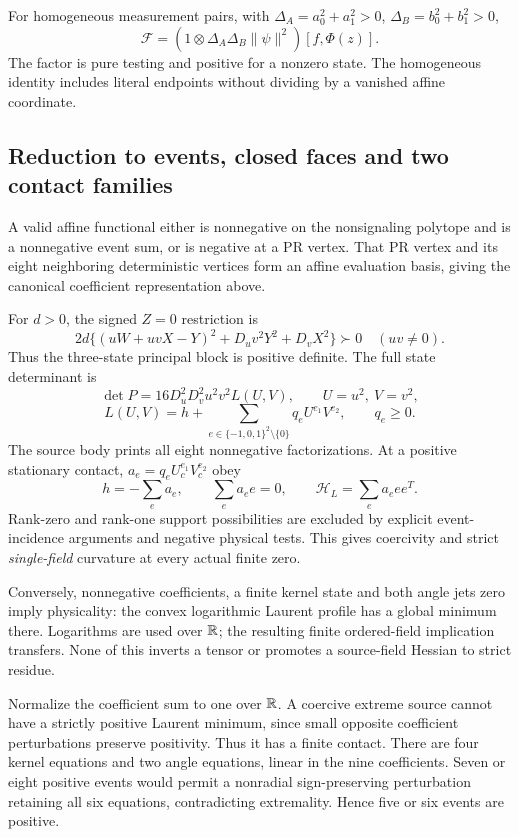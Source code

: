 For homogeneous measurement pairs, with
\(\Delta_A=a_0^2+a_1^2>0\), \(\Delta_B=b_0^2+b_1^2>0\),
\[
 \mathcal F=(1\otimes\Delta_A\Delta_B\|\psi\|^2)[f,\Phi(z)].
\]
The factor is pure testing and positive for a nonzero state.
The homogeneous identity includes literal endpoints without dividing
by a vanished affine coordinate. 

\subsection{Reduction to events, closed faces and two contact families}

A valid affine functional either is nonnegative on the nonsignaling
polytope and is a nonnegative event sum, or is negative at a PR vertex.
That PR vertex and its eight neighboring deterministic vertices form
an affine evaluation basis, giving the canonical coefficient
representation above.

For \(d>0\), the signed \(Z=0\) restriction is
\[
 2d\{(uW+uvX-Y)^2+D_uv^2Y^2+D_vX^2\}\succ0
 \quad(uv\ne0).
\]
Thus the three-state principal block is positive definite.
The full state determinant is
\[
 \det P=16D_u^2D_v^2u^2v^2L(U,V),\qquad U=u^2,\ V=v^2,
\]
\[
 L(U,V)=h+\sum_{e\in\{-1,0,1\}^2\setminus\{0\}}
 q_eU^{e_1}V^{e_2},\qquad q_e\ge0.
\]
The source body prints all eight nonnegative factorizations.
At a positive stationary contact,
\(a_e=q_eU_c^{e_1}V_c^{e_2}\) obey
\[
 h=-\sum_ea_e,\qquad \sum_ea_ee=0,\qquad
 \mathcal H_L=\sum_ea_eee^T.
\]
Rank-zero and rank-one support possibilities are excluded by explicit
event-incidence arguments and negative physical tests. This gives
coercivity and strict \emph{single-field} curvature at every actual
finite zero.

Conversely, nonnegative coefficients, a finite kernel state and both
angle jets zero imply physicality: the convex logarithmic Laurent
profile has a global minimum there. Logarithms are used over \(\mathbb R\);
the resulting finite ordered-field implication transfers. None of this
inverts a tensor or promotes a source-field Hessian to strict residue.

Normalize the coefficient sum to one over \(\mathbb R\).
A coercive extreme source cannot have a strictly positive Laurent
minimum, since small opposite coefficient perturbations preserve
positivity. Thus it has a finite contact.
There are four kernel equations and two angle equations, linear in
the nine coefficients. Seven or eight positive events would permit a
nonradial sign-preserving perturbation retaining all six equations,
contradicting extremality. Hence five or six events are positive.

